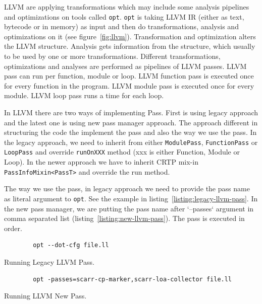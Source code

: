 LLVM are applying transformations \textemdash{} which may include some analysis
pipelines \textemdash{} and optimizations on tools called \texttt{opt}.
\texttt{opt} is taking LLVM IR (either as text, bytecode or in memory) as input
and then do transformations, analysis and optimizations on it (see
figure~\ref{fig:llvm}). Transformation and optimization alters the LLVM
structure. Analysis gets information from the structure, which usually to be
used by one or more transformations. Different transformations, optimizations
and analyses are performed as pipelines of LLVM passes. LLVM pass can run per
function, module or loop. LLVM function pass is executed once for every function
in the program. LLVM module pass is executed once for every module. LLVM loop
pass runs a time for each loop.  


In LLVM there are two ways of implementing Pass. First is using legacy approach
and the latest one is using new pass manager approach. The approach different in
structuring the code the implement the pass and also the way we use the pass.
In the legacy approach, we need to inherit from either \texttt{ModulePass},
\texttt{FunctionPass} or \texttt{LoopPass} and override \texttt{runOnXXX} method
(xxx is either Function, Module or Loop). In the newer approach we have to
inherit CRTP mix-in \texttt{PassInfoMixin<PassT>} and override the run method.

The way we use the pass, in legacy approach we need to provide the pass name as
literal argument to \texttt{opt}. See the example in
listing~\ref{listing:legacy-llvm-pass}. In the new pass manager, we are putting
the pass name after `--passes` argument in comma separated list
(listing~\ref{listing:new-llvm-pass}). The pass is executed in order.

\begin{listing}[htbp]
    \begin{verbatim}
        opt --dot-cfg file.ll 
    \end{verbatim}
    \caption{Running Legacy LLVM Pass.}    
    \label{listing:legacy-llvm-pass}
\end{listing}

\begin{listing}[htpb]
    \begin{verbatim}
        opt -passes=scarr-cp-marker,scarr-loa-collector file.ll 
    \end{verbatim}
    \caption{Running LLVM New Pass.}    
    \label{listing:new-llvm-pass}
\end{listing}

